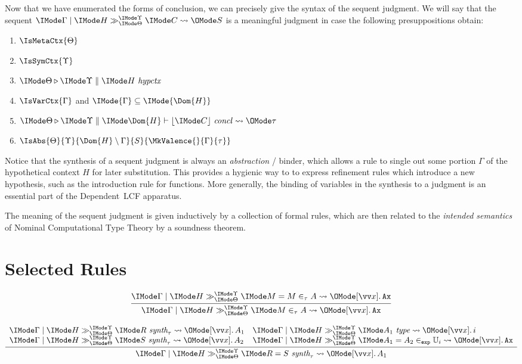 Now that we have enumerated the forms of conclusion, we can precisely give the
syntax of the sequent judgment. We will say that the sequent
$\PRLSequent{\Gamma}{H}{\Theta}{\Upsilon}{C}{S}$ is a meaningful judgment in
case the following presuppositions obtain:
\begin{enumerate}
  \item $\IsMetaCtx{\Theta}$
  \item $\IsSymCtx{\Upsilon}$
  \item $\IsHypCtx{\Theta}{\Upsilon}{H}$
  \item $\IsVarCtx{\Gamma}$ and $\IMode{\Gamma}\subseteq\IMode{\Dom{H}}$
  \item $\IsConcl{\Theta}{\Upsilon}{\Dom{H}}{C}{\tau}$
  \item $\IsAbs{\Theta}{\Upsilon}{\Dom{H}\setminus \Gamma}{S}{\MkValence{}{\Gamma}{\tau}}$
\end{enumerate}

Notice that the synthesis of a sequent judgment is always an \emph{abstraction}
/ binder, which allows a rule to single out some portion $\Gamma$ of the
hypothetical context $H$ for later substitution. This provides a hygienic way
to to express refinement rules which introduce a new hypothesis, such as the
introduction rule for functions. More generally, the binding of
variables in the synthesis to a judgment is an essential part of the
Dependent~LCF apparatus.

The meaning of the sequent judgment is given inductively by a collection of
formal rules, which are then related to the \emph{intended semantics} of
Nominal Computational Type Theory by a soundness theorem.

\section{Selected Rules}

\[
  \infer{
    \PRLSequent{\Gamma}{H}{\Theta}{\Upsilon}{M \in_\tau A}{\MkAbs{}{\vec{x}}{\mathtt{Ax}}}
  }{
    \PRLSequent{\Gamma}{H}{\Theta}{\Upsilon}{M = M \in_\tau A}{\MkAbs{}{\vec{x}}{\mathtt{Ax}}}
  }
\]

\[
  \infer{
    \PRLSequent{\Gamma}{H}{\Theta}{\Upsilon}{R = S\ \textit{synth}_\tau}{\MkAbs{}{\vec{x}}{A_1}}
  }{
    \begin{array}{l}
      \PRLSequent{\Gamma}{H}{\Theta}{\Upsilon}{R\ \textit{synth}_\tau}{\MkAbs{}{\vec{x}}{A_1}}\\
      \PRLSequent{\Gamma}{H}{\Theta}{\Upsilon}{S\ \textit{synth}_\tau}{\MkAbs{}{\vec{x}}{A_2}}
    \end{array}
    \begin{array}{l}
      \PRLSequent{\Gamma}{H}{\Theta}{\Upsilon}{A_1\ \textit{type}}{\MkAbs{}{\vec{x}}{i}}\\
      \PRLSequent{\Gamma}{H}{\Theta}{\Upsilon}{A_1=A_2\in_\AbtSortExp \mathbb{U}_i}{\MkAbs{}{\vec{x}}{\mathtt{Ax}}}
    \end{array}
  }
\]


